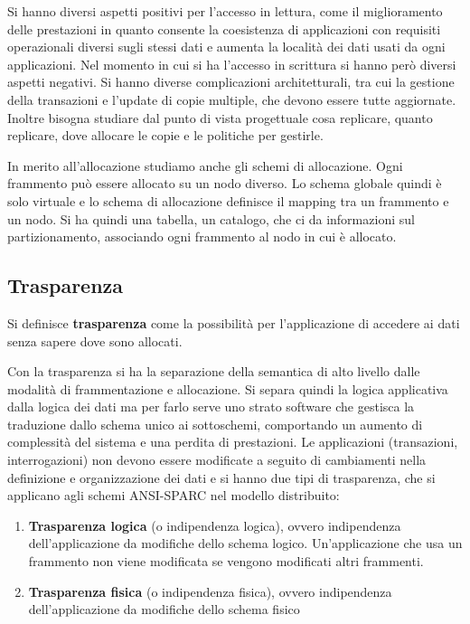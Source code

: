 Si hanno diversi aspetti positivi per l'accesso in lettura, come il miglioramento
delle prestazioni in quanto consente la coesistenza di applicazioni con requisiti
operazionali diversi sugli stessi dati e aumenta la località dei dati usati da
ogni applicazioni. Nel momento in cui si ha l'accesso in scrittura si hanno però
diversi aspetti negativi. Si hanno diverse complicazioni architetturali, tra cui
la gestione della transazioni e l'update di copie multiple, che devono essere
tutte aggiornate. Inoltre bisogna studiare dal punto di vista progettuale cosa
replicare, quanto replicare, dove allocare le copie e le politiche per gestirle.

In merito all'allocazione studiamo anche gli schemi di allocazione. Ogni
frammento può essere allocato su un nodo diverso. Lo schema globale quindi
è solo virtuale e lo schema di allocazione definisce il mapping tra un frammento
e un nodo. Si ha quindi una tabella, un catalogo, che ci da informazioni sul
partizionamento, associando ogni frammento al nodo in cui è allocato.
\subsection{Trasparenza}

\begin{definizione}
    Si definisce \textbf{trasparenza} come la possibilità per l'applicazione di
    accedere ai dati senza sapere dove sono allocati.
\end{definizione}

Con la trasparenza si ha la separazione della semantica di alto livello dalle
modalità di frammentazione e allocazione. Si separa quindi la logica applicativa
dalla logica dei dati ma per farlo serve uno strato software che gestisca la
traduzione dallo schema unico ai sottoschemi, comportando un aumento di
complessità del sistema e una perdita di prestazioni.
Le applicazioni (transazioni, interrogazioni) non devono essere modificate a
seguito di cambiamenti nella definizione e organizzazione dei dati e si hanno
due tipi di trasparenza, che si applicano agli schemi ANSI-SPARC nel
modello distribuito:
\begin{enumerate}
    \item \textbf{Trasparenza logica} (o indipendenza logica), ovvero
          indipendenza dell'applicazione da modifiche dello schema logico.
          Un'applicazione che usa un frammento non viene modificata se vengono
          modificati altri frammenti.
    \item \textbf{Trasparenza fisica} (o indipendenza fisica), ovvero
          indipendenza dell'applicazione da modifiche dello schema fisico
\end{enumerate}


